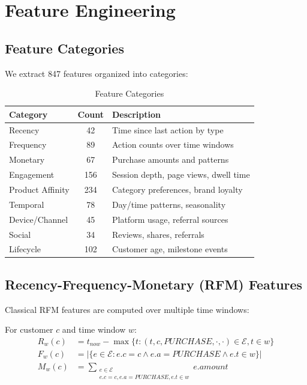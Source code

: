 \section{Feature Engineering}


\subsection{Feature Categories}

We extract 847 features organized into categories:

\begin{table}[h]
\centering
\caption{Feature Categories}
\begin{tabular}{lcp{6cm}}
\toprule
\textbf{Category} & \textbf{Count} & \textbf{Description} \\
\midrule
Recency & 42 & Time since last action by type \\
Frequency & 89 & Action counts over time windows \\
Monetary & 67 & Purchase amounts and patterns \\
Engagement & 156 & Session depth, page views, dwell time \\
Product Affinity & 234 & Category preferences, brand loyalty \\
Temporal & 78 & Day/time patterns, seasonality \\
Device/Channel & 45 & Platform usage, referral sources \\
Social & 34 & Reviews, shares, referrals \\
Lifecycle & 102 & Customer age, milestone events \\
\bottomrule
\end{tabular}
\end{table}

\subsection{Recency-Frequency-Monetary (RFM) Features}

Classical RFM features are computed over multiple time windows:

\begin{definition}
For customer $c$ and time window $w$:
\begin{align}
R_w(c) &= t_{now} - \max\{t : (t, c, PURCHASE, \cdot, \cdot) \in \mathcal{E}, t \in w\} \\
F_w(c) &= |\{e \in \mathcal{E} : e.c = c \land e.a = PURCHASE \land e.t \in w\}| \\
M_w(c) &= \sum_{\substack{e \in \mathcal{E} \\ e.c = c, e.a = PURCHASE, e.t \in w}} e.amount
\end{align}
\end{definition}

